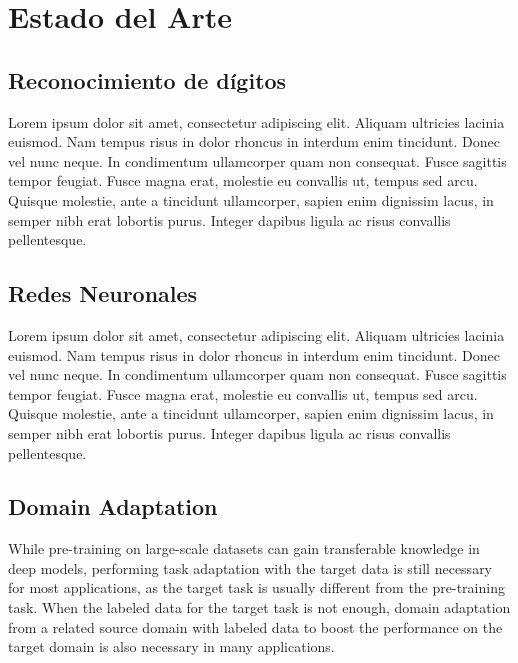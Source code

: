\chapter{Estado del Arte}

\label{Chapter2}

\section{Reconocimiento de d\'igitos}

Lorem ipsum dolor sit amet, consectetur adipiscing elit. Aliquam ultricies lacinia euismod. Nam tempus risus in dolor rhoncus in interdum enim tincidunt. Donec
vel nunc neque. In condimentum ullamcorper quam non consequat. Fusce sagittis tempor feugiat. Fusce magna erat, molestie eu convallis ut, tempus sed arcu.
Quisque molestie, ante a tincidunt ullamcorper, sapien enim dignissim lacus, in semper nibh erat lobortis purus. Integer dapibus ligula ac risus convallis
pellentesque.

\section{Redes Neuronales}

Lorem ipsum dolor sit amet, consectetur adipiscing elit. Aliquam ultricies lacinia euismod. Nam tempus risus in dolor rhoncus in interdum enim tincidunt. Donec
vel nunc neque. In condimentum ullamcorper quam non consequat. Fusce sagittis tempor feugiat. Fusce magna erat, molestie eu convallis ut, tempus sed arcu.
Quisque molestie, ante a tincidunt ullamcorper, sapien enim dignissim lacus, in semper nibh erat lobortis purus. Integer dapibus ligula ac risus convallis
pellentesque.

\section{Domain Adaptation}

While pre-training on large-scale datasets can gain transferable knowledge in deep models, performing task adaptation with the target data is still necessary
for most applications, as the target task is usually different from the pre-training task. When the labeled data for the target task is not enough, domain
adaptation from a related source domain with labeled data to boost the performance on the target domain is also necessary in many applications.